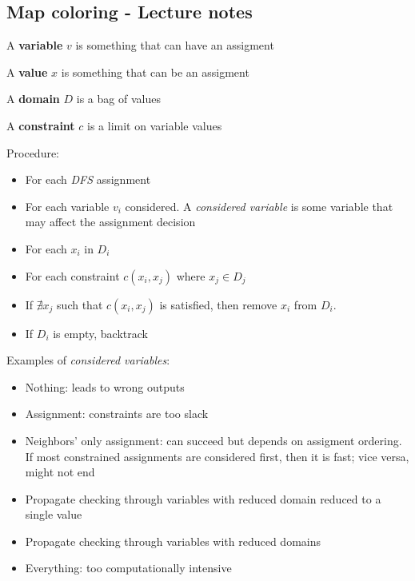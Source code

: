 \subsection{Map coloring - Lecture notes}

\begin{definition}
  A \textbf{variable} $v$ is something that can have an assigment
\end{definition}

\begin{definition}
  A \textbf{value} $x$ is something that can be an assigment
\end{definition}

\begin{definition}
  A \textbf{domain} $D$ is a bag of values
\end{definition}

\begin{definition}
  A \textbf{constraint} $c$ is a limit on variable values
\end{definition}

Procedure:
\begin{itemize}
  \item For each \textit{DFS} assignment
  \item For each variable $v_i$ considered.  A \textit{considered 
    variable} is some variable that may affect the assignment decision
  \item For each $x_i$ in $D_i$
  \item For each constraint $c(x_i, x_j)$ where $x_j \in D_j$
  \item If $\nexists x_j$ such that $c(x_i, x_j)$ is satisfied,
    then remove $x_i$ from $D_i$.
  \item If $D_i$ is empty, backtrack
\end{itemize}

Examples of \textit{considered variables}:
\begin{itemize}
  \item Nothing: leads to wrong outputs
  \item Assignment: constraints are too slack
  \item Neighbors' only assignment: can succeed but depends on
    assigment ordering. If most constrained assignments are
    considered first, then it is fast; vice versa, might not end
  \item Propagate checking through variables with reduced domain
    reduced to a single value
  \item Propagate checking through variables with reduced domains 
  \item Everything: too computationally intensive
\end{itemize}

